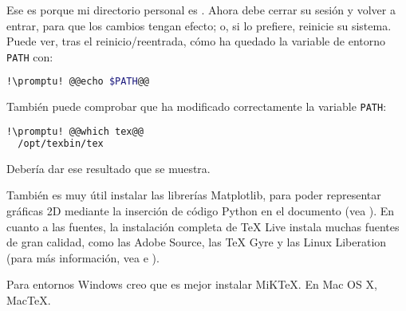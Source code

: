 \noindent Ese  es porque mi directorio personal es . Ahora debe cerrar su sesión
y volver a entrar, para que los cambios tengan efecto; o, si lo prefiere, reinicie su sistema. Puede ver, tras
el reinicio/reentrada, cómo ha quedado la variable de entorno \lstinline+PATH+ con:

\begin{lstlisting}[gobble=2,language=bash,style=bashinteract,escapechar=!]
  !\promptu! @@echo $PATH@@
\end{lstlisting}

\noindent También puede comprobar que ha modificado correctamente la variable \lstinline!PATH!:

\begin{lstlisting}[gobble=2,language=bash,style=bashinteract,escapechar=!]
  !\promptu! @@which tex@@
  /opt/texbin/tex
\end{lstlisting}

\noindent Debería dar ese resultado que se muestra.

También es muy útil instalar las librerías Matplotlib, para poder representar gráficas 2D mediante la inserción
de código Python en el documento (vea ). En cuanto a las fuentes, la instalación
completa de \TeX{} Live instala muchas fuentes de gran calidad, como las Adobe Source, las \TeX{} Gyre y las
Linux Liberation (para más información, vea  e ).
 
Para entornos Windows creo que es mejor instalar MiKTeX. En Mac OS X, MacTeX.
